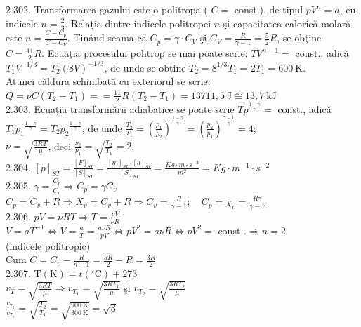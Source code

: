 2.302. Transformarea gazului este o politropă ( $C=$ const.), de tipul $p V^{n}=a$, cu indicele $n=\frac{2}{3}$. Relația dintre indicele politropei $n$ şi capacitatea calorică molară este $n=\frac{C-C_{p}}{C-C_{V}}$. Tinând seama că $C_{p}=\gamma \cdot C_{V}$ şi $C_{V}=\frac{R}{\gamma-1}=\frac{5}{2} R$, se obţine $C=\frac{11}{2} R$. Ecuaţia procesului politrop se mai poate scrie: $T V^{n-1}=$ const., adică $T_{1} V^{-1 / 3}=T_{2}(8 V)^{-1 / 3}$, de unde se obține $T_{2}=8^{1 / 3} T_{1}=2 T_{1}=600 \mathrm{~K}$.\\ Atunci căldura schimbată cu exteriorul se scrie:\\ $Q=\nu C\left(T_{2}-T_{1}\right)==\frac{11}{2} R\left(T_{2}-T_{1}\right)=13711,5 \mathrm{~J} \cong 13,7 \mathrm{~kJ}$\\

2.303. Ecuația transformării adiabatice se poate scrie $T p^{\frac{1-\gamma}{\gamma}}=$ const., adică $T_{1} p_{1}{ }^{\frac{1-\gamma}{\gamma}}=T_{2} p_{2}{ }^{\frac{1-\gamma}{\gamma}}$, de unde $\frac{T_{2}}{T_{1}}=\left(\frac{p_{1}}{p_{2}}\right)^{\frac{1-\gamma}{\gamma}}=\left(\frac{p_{2}}{p_{1}}\right)^{\frac{\gamma-1}{\gamma}}=4$;\\ $\nu=\sqrt{\frac{3 R T}{\mu}}$, deci $\frac{\nu_{2}}{\nu_{1}}=\sqrt{\frac{T_{2}}{T_{1}}}=2$.\\

2.304. $[p]_{S I}=\frac{[F]_{S I}}{[S]_{S I}}=\frac{[m]_{S I} \cdot[a]_{S I}}{[S]_{S I}}=\frac{K g \cdot m \cdot s^{-2}}{m^{2}}=K g \cdot m^{-1} \cdot s^{-2}$\\

2.305. $\gamma=\frac{C_{p}}{C_{v}} \Rightarrow C_{p}=\gamma C_{v}$\\ $C_{p}=C_{v}+R \Rightarrow X_{v}=C_{v}+R \Rightarrow C_{v}=\frac{R}{\gamma-1} ; \quad C_{p}=\chi_{v}=\frac{R \gamma}{\gamma-1}$\\

2.306. $p V=\nu R T \Rightarrow T=\frac{p V}{\nu R}$\\ $V=a T^{-1} \Leftrightarrow V=\frac{a}{T}=\frac{a \nu R}{p V} \Leftrightarrow p V^{2}=a \nu R \Leftrightarrow p V^{2}=$ const $. \Rightarrow n=2$\\ (indicele politropic)\\ Cum $C=C_{v}-\frac{R}{n-1}=\frac{5 R}{2}-R=\frac{3 R}{2}$\\

2.307. $\mathrm{T}(\mathrm{K})=t\left({ }^{\circ} \mathrm{C}\right)+273$\\ $v_{T}=\sqrt{\frac{3 R T}{\mu}} \Rightarrow v_{T_{1}}=\sqrt{\frac{3 R T_{1}}{\mu}}$ şi $v_{T_{2}}=\sqrt{\frac{3 R T_{2}}{\mu}}$\\ $\frac{v_{T_{2}}}{v_{T_{1}}}=\sqrt{\frac{T_{2}}{T_{1}}}=\sqrt{\frac{900 \mathrm{~K}}{300 \mathrm{~K}}}=\sqrt{3}$\\

